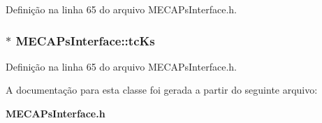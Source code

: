 Definição na linha 65 do arquivo M\+E\+C\+A\+Ps\+Interface.\+h.

\subsubsection[{tc\+Ks}]{ $\ast$ M\+E\+C\+A\+Ps\+Interface\+::tc\+Ks}\label{class_m_e_c_a_ps_interface_a54b4b89c894ded19d6e147653c59a91e}


Definição na linha 65 do arquivo M\+E\+C\+A\+Ps\+Interface.\+h.



A documentação para esta classe foi gerada a partir do seguinte arquivo\+:\begin{DoxyCompactItemize}
\item 
{\bf M\+E\+C\+A\+Ps\+Interface.\+h}\end{DoxyCompactItemize}
